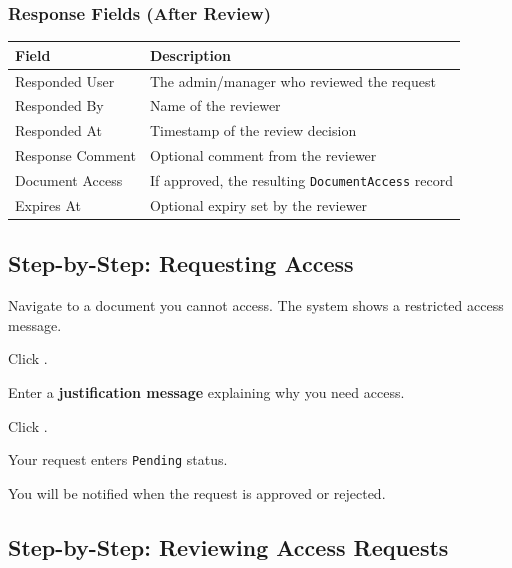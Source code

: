 \subsubsection*{Response Fields (After Review)}

\begin{tabularx}{\textwidth}{@{} l X @{}}
  \toprule
  \textbf{Field} & \textbf{Description} \\
  \midrule
  Responded User
    & The admin/manager who reviewed the request \\
  Responded By
    & Name of the reviewer \\
  Responded At
    & Timestamp of the review decision \\
  Response Comment
    & Optional comment from the reviewer \\
  Document Access
    & If approved, the resulting
      \texttt{DocumentAccess} record \\
  Expires At
    & Optional expiry set by the reviewer \\
  \bottomrule
\end{tabularx}

\subsection{Step-by-Step: Requesting Access}

\begin{ugSteps}
  \item Navigate to a document you cannot access. The system
        shows a restricted access message.
  \item Click .
  \item Enter a \textbf{justification message} explaining
        why you need access.
  \item Click .
  \item Your request enters \texttt{Pending} status.
  \item You will be notified when the request is approved
        or rejected.
\end{ugSteps}

\subsection{Step-by-Step: Reviewing Access Requests}


